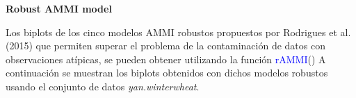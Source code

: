 
\textbf{Robust AMMI model}

Los biplots de los cinco modelos AMMI robustos propuestos por Rodrigues et al. (2015) que permiten superar el problema de la contaminación de datos con observaciones atípicas, se pueden obtener utilizando la función \textcolor{blue}{rAMMI}() A continuación se muestran los biplots obtenidos con dichos modelos robustos usando el conjunto de datos \emph{yan.winterwheat}.

